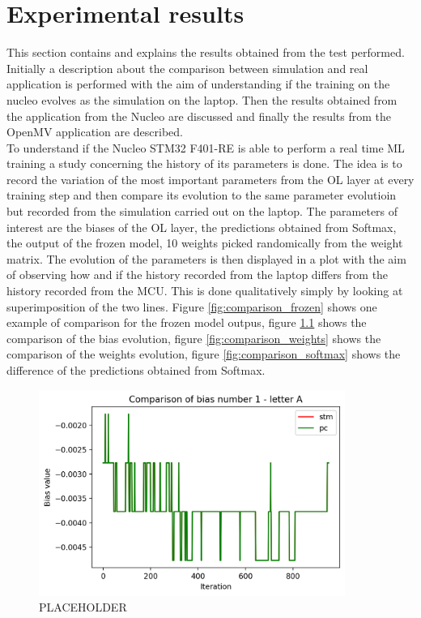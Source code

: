 \documentclass[12pt]{report}
\begin{document}
\chapter{Experimental results} 

This section contains and explains the results obtained from the test performed. Initially a description about the comparison between simulation and real application is performed with the aim of understanding if the training on the nucleo evolves as the simulation on the laptop. Then the results obtained from the application from the Nucleo are discussed and finally the results from the OpenMV application are described.\\
To understand if the Nucleo STM32 F401-RE is able to perform a real time ML training a study concerning the history of its parameters is done. The idea is to record the variation of the most important parameters from the OL layer at every training step and then compare its evolution to the same parameter evolutioin but recorded from the simulation carried out on the laptop. The parameters of interest are the biases of the OL layer, the predictions obtained from Softmax, the output of the frozen model, 10 weights picked randomically from the weight matrix. The evolution of the parameters is then displayed in a plot with the aim of observing how and if the history recorded from the laptop differs from the history recorded from the MCU. This is done qualitatively simply by looking at superimposition of the two lines. Figure \ref{fig:comparison_frozen} shows one example of comparison for the frozen model outpus, figure \ref{fig:comparison_bias} shows the comparison of the bias evolution, figure \ref{fig:comparison_weights} shows the comparison of the weights evolution, figure \ref{fig:comparison_softmax} shows the difference of the predictions obtained from Softmax.
%
\begin{figure}[h!]
    \centering
    \includegraphics[width=100mm]{Figures/Chapter5/bias_example.png} 
    \caption{PLACEHOLDER}
    \label{fig:comparison_bias}    
\end{figure}
\end{document}
